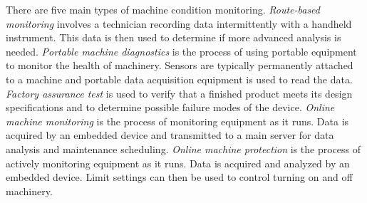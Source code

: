 

There are five main types of machine condition monitoring.
\emph{Route-based monitoring} involves a technician recording data intermittently with a handheld instrument. This data is then used to determine if more advanced analysis is needed.
\emph{Portable machine diagnostics} is the process of using portable equipment to monitor the health of machinery. Sensors are typically permanently attached to a machine and portable data acquisition equipment is used to read the data.
\emph{Factory assurance test} is used to verify that a finished product meets its design specifications and to determine possible failure modes of the device. 
\emph{Online machine monitoring} is the process of monitoring equipment as it runs. Data is acquired by an embedded device and transmitted to a main server for data analysis and maintenance scheduling. 
\emph{Online machine protection} is the process of actively monitoring equipment as it runs. Data is acquired and analyzed by an embedded device. Limit settings can then be used to control turning on and off machinery.

